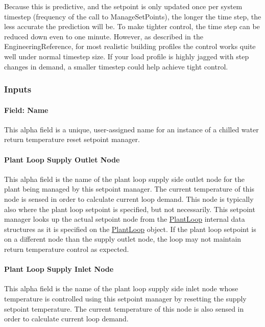 Because this is predictive, and the setpoint is only updated once per system timestep (frequency of the call to ManageSetPoints), the longer the time step, the less accurate the prediction will be. To make tighter control, the time step can be reduced down even to one minute. However, as described in the EngineeringReference, for most realistic building profiles the control works quite well under normal timestep size. If your load profile is highly jagged with step changes in demand, a smaller timestep could help achieve tight control.

\subsubsection{Inputs}\label{inputs-26-001}

\paragraph{Field: Name}\label{field-name-27-001}

This alpha field is a unique, user-assigned name for an instance of a chilled water return temperature reset setpoint manager.

\paragraph{Plant Loop Supply Outlet Node}\label{plant-loop-supply-outlet-node}

This alpha field is the name of the plant loop supply side outlet node for the plant being managed by this setpoint manager. The current temperature of this node is sensed in order to calculate current loop demand. This node is typically also where the plant loop setpoint is specified, but not necessarily. This setpoint manager looks up the actual setpoint node from the \hyperref[plantloop]{PlantLoop} internal data structures as it is specified on the \hyperref[plantloop]{PlantLoop} object. If the plant loop setpoint is on a different node than the supply outlet node, the loop may not maintain return temperature control as expected.

\paragraph{Plant Loop Supply Inlet Node}\label{plant-loop-supply-inlet-node}

This alpha field is the name of the plant loop supply side inlet node whose temperature is controlled using this setpoint manager by resetting the supply setpoint temperature. The current temperature of this node is also sensed in order to calculate current loop demand.


